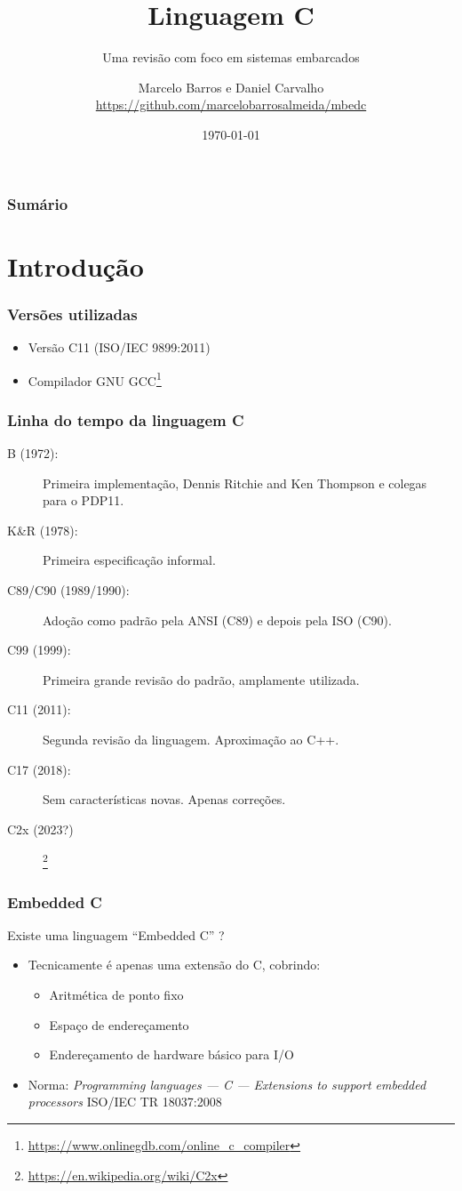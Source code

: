 \documentclass{beamer}
\title{Linguagem C}
\subtitle{Uma revisão com foco em sistemas embarcados}
\author{Marcelo Barros e Daniel Carvalho
{\tiny \url{https://github.com/marcelobarrosalmeida/mbedc}}}
\institute{UFU/FEELT}
\date{\today}
\begin{document}
\begin{frame}
\titlepage
\end{frame}

\begin{frame}
\frametitle{Sumário}
\tableofcontents
\end{frame}

\section{Introdução}

\begin{frame}
	\frametitle{Versões utilizadas}
	\begin{itemize}
		\item Versão C11 (ISO/IEC 9899:2011)
		\item Compilador GNU GCC\footnote{\url{https://www.onlinegdb.com/online_c_compiler}}
	\end{itemize}
\end{frame}

\begin{frame}
	\frametitle{Linha do tempo da linguagem C}
	\begin{description}
		\item[ B (1972):] Primeira implementação, Dennis Ritchie and Ken Thompson e colegas para o PDP11.
		\item [K\&R (1978):] Primeira especificação informal.
		\item [C89/C90 (1989/1990):] Adoção como padrão pela ANSI (C89) e depois pela ISO (C90).
		\item [C99 (1999):] Primeira grande revisão do padrão, amplamente utilizada.
		\item [C11 (2011):] Segunda revisão da linguagem. Aproximação ao C++.
		\item [C17 (2018):] Sem características novas. Apenas correções.
		\item [C2x (2023?)]\footnote{\url{https://en.wikipedia.org/wiki/C2x}}
	\end{description}
\end{frame}

\begin{frame}
	\frametitle{Embedded C}
	{Existe uma linguagem ``Embedded C'' ?}
	\vspace*{0.5cm}
	\begin{itemize}
		\item Tecnicamente é apenas uma extensão do C, cobrindo:
	\begin{itemize}
		\item Aritmética de ponto fixo
		\item Espaço de endereçamento
		\item Endereçamento de hardware básico para I/O
	\end{itemize}
		\item Norma: \textit{Programming languages — C — Extensions to support embedded processors}
		ISO/IEC TR 18037:2008
	\end{itemize}
\end{frame}
\end{document}
